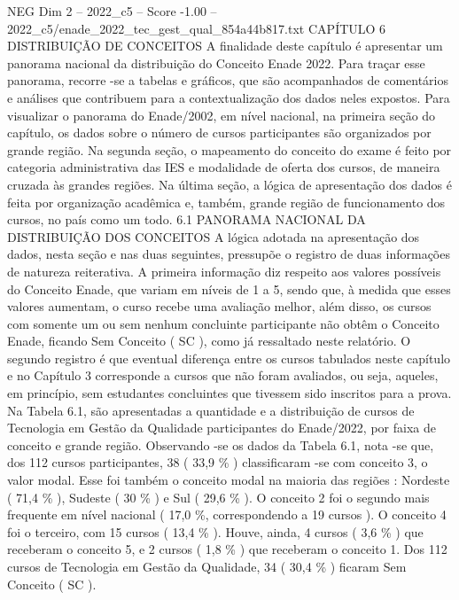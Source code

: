 \begin{textsample}{NEG Dim 2 – 2022\_c5 – Score -1.00 – 2022\_c5/enade\_2022\_tec\_gest\_qual\_854a44b817.txt}  \label{ex:f2_neg_219}
CAPÍTULO 6 DISTRIBUIÇÃO DE CONCEITOS A finalidade deste capítulo é apresentar um panorama nacional da distribuição do Conceito Enade 2022.
Para traçar esse panorama, recorre -se a tabelas e gráficos, que são acompanhados de comentários e análises que contribuem para a contextualização dos dados neles expostos.
Para visualizar o panorama do Enade/2002, em nível nacional, na primeira seção do capítulo, os dados sobre o número de cursos participantes são organizados por grande região.
Na segunda seção, o mapeamento do conceito do exame é feito por categoria administrativa das IES e modalidade de oferta dos cursos, de maneira cruzada às grandes regiões.
Na última seção, a lógica de apresentação dos dados é feita por organização acadêmica e, também, grande região de funcionamento dos cursos, no país como um todo. 6.1 PANORAMA NACIONAL DA DISTRIBUIÇÃO DOS CONCEITOS A lógica adotada na apresentação dos dados, nesta seção e nas duas seguintes, pressupõe o registro de duas informações de natureza reiterativa.
A primeira informação diz respeito aos valores possíveis do Conceito Enade, que variam em níveis de 1 a 5, sendo que, à medida que esses valores aumentam, o curso recebe uma avaliação melhor, além disso, os cursos com somente um ou sem nenhum concluinte participante não obtêm o Conceito Enade, ficando Sem Conceito ( SC ), como já ressaltado neste relatório.
O segundo registro é que eventual diferença entre os cursos tabulados neste capítulo e no Capítulo 3 corresponde a cursos que não foram avaliados, ou seja, aqueles, em princípio, sem estudantes concluintes que tivessem sido inscritos para a prova.
Na Tabela 6.1, são apresentadas a quantidade e a distribuição de cursos de Tecnologia em Gestão da Qualidade participantes do Enade/2022, por faixa de conceito e grande região.
Observando -se os dados da Tabela 6.1, nota -se que, dos 112 cursos participantes, 38 ( 33,9 \% ) classificaram -se com conceito 3, o valor modal.
Esse foi também o conceito modal na maioria das regiões : Nordeste ( 71,4 \% ), Sudeste ( 30 \% ) e Sul ( 29,6 \% ).
O conceito 2 foi o segundo mais frequente em nível nacional ( 17,0 \%, correspondendo a 19 cursos ).
O conceito 4 foi o terceiro, com 15 cursos ( 13,4 \% ).
Houve, ainda, 4 cursos ( 3,6 \% ) que receberam o conceito 5, e 2 cursos ( 1,8 \% ) que receberam o conceito 1.
Dos 112 cursos de Tecnologia em Gestão da Qualidade, 34 ( 30,4 \% ) ficaram Sem Conceito ( SC ).

\end{textsample}
